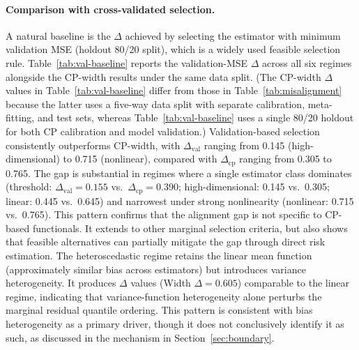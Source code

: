 \documentclass[a4paper,11pt]{article}
\begin{document}
\paragraph{Comparison with cross-validated selection.}
A natural baseline is the $\Delta$ achieved by selecting the estimator with minimum validation MSE (holdout 80/20 split), which is a widely used feasible selection rule. Table~\ref{tab:val-baseline} reports the validation-MSE $\Delta$ across all six regimes alongside the CP-width results under the same data split. (The CP-width $\Delta$ values in Table~\ref{tab:val-baseline} differ from those in Table~\ref{tab:misalignment} because the latter uses a five-way data split with separate calibration, meta-fitting, and test sets, whereas Table~\ref{tab:val-baseline} uses a single 80/20 holdout for both CP calibration and model validation.) Validation-based selection consistently outperforms CP-width, with $\Delta_{\text{val}}$ ranging from 0.145 (high-dimensional) to 0.715 (nonlinear), compared with $\Delta_{\text{cp}}$ ranging from 0.305 to 0.765. The gap is substantial in regimes where a single estimator class dominates (threshold: $\Delta_{\text{val}} = 0.155$ vs.\ $\Delta_{\text{cp}} = 0.390$; high-dimensional: 0.145 vs.\ 0.305; linear: 0.445 vs.\ 0.645) and narrowest under strong nonlinearity (nonlinear: 0.715 vs.\ 0.765). This pattern confirms that the alignment gap is not specific to CP-based functionals. It extends to other marginal selection criteria, but also shows that feasible alternatives can partially mitigate the gap through direct risk estimation. The heteroscedastic regime retains the linear mean function (approximately similar bias across estimators) but introduces variance heterogeneity. It produces $\Delta$ values (Width $\Delta = 0.605$) comparable to the linear regime, indicating that variance-function heterogeneity alone perturbs the marginal residual quantile ordering. This pattern is consistent with bias heterogeneity as a primary driver, though it does not conclusively identify it as such, as discussed in the mechanism in Section~\ref{sec:boundary}.
\end{document}
